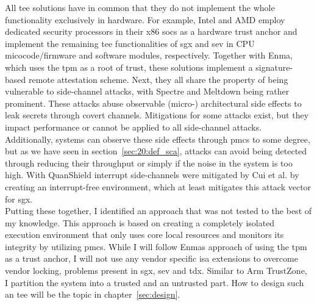 All \gls{tee} solutions have in common that they do not implement the whole
functionality exclusively in hardware. For example, Intel and AMD employ
dedicated security processors in their x86 \glspl{soc} as a hardware trust
anchor and implement the remaining \gls{tee} functionalities of \gls{sgx} and
\gls{sev} in CPU micocode/firmware and software modules, respectively. Together
with Enma, which uses the \gls{tpm} as a root of trust, these solutions
implement a signature-based remote attestation scheme. Next, they all share the
property of being vulnerable to side-channel attacks, with Spectre and Meltdown
being rather prominent. These attacks abuse observable (micro-) architectural
side effects to leak secrets through covert channels. Mitigations for some
attacks exist, but they impact performance or cannot be applied to all
side-channel attacks. Additionally, systems can observe these side effects
through \glspl{pmc} to some degree, but as we have seen in
section~\ref{sec:20:def_sca}, attacks can avoid being detected through reducing
their throughput or simply if the noise in the system is too high. With
QuanShield interrupt side-channels were mitigated by Cui et al. by creating an
interrupt-free environment, which at least mitigates this attack vector for
\gls{sgx}.\\

Putting these together, I identified an approach that was not tested to the best
of my knowledge. This approach is based on creating a completely isolated
execution environment that only uses core local resources and monitors its
integrity by utilizing \glspl{pmc}. While I will follow Enmas approach of using
the \gls{tpm} as a trust anchor, I will not use any vendor specific \gls{isa}
extensions to overcome vendor locking, problems present in \gls{sgx}, \gls{sev}
and \gls{tdx}. Similar to Arm TrustZone, I partition the system into a trusted
and an untrusted part. How to design such an \gls{tee} will be the topic in
chapter~\ref{sec:design}.

